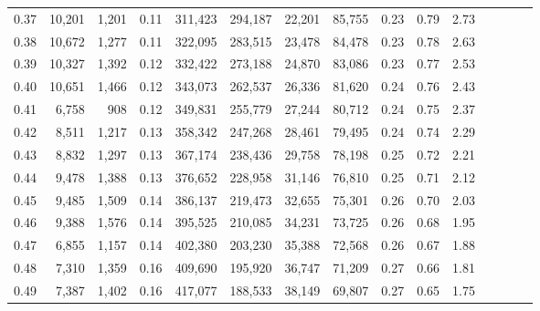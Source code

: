 \begin{tabular}{rrrcrrrrrrrrrrr}
0.37 &  10,201 &  1,201 &                                       0.11 &  311,423 &  294,187 &   22,201 &   85,755 &  0.23 &  0.79 &                         2.73 \\
0.38 &  10,672 &  1,277 &                                       0.11 &  322,095 &  283,515 &   23,478 &   84,478 &  0.23 &  0.78 &                         2.63 \\
0.39 &  10,327 &  1,392 &                                       0.12 &  332,422 &  273,188 &   24,870 &   83,086 &  0.23 &  0.77 &                         2.53 \\
0.40 &  10,651 &  1,466 &                                       0.12 &  343,073 &  262,537 &   26,336 &   81,620 &  0.24 &  0.76 &                         2.43 \\
0.41 &   6,758 &    908 &                                       0.12 &  349,831 &  255,779 &   27,244 &   80,712 &  0.24 &  0.75 &                         2.37 \\
0.42 &   8,511 &  1,217 &                                       0.13 &  358,342 &  247,268 &   28,461 &   79,495 &  0.24 &  0.74 &                         2.29 \\
0.43 &   8,832 &  1,297 &                                       0.13 &  367,174 &  238,436 &   29,758 &   78,198 &  0.25 &  0.72 &                         2.21 \\
0.44 &   9,478 &  1,388 &                                       0.13 &  376,652 &  228,958 &   31,146 &   76,810 &  0.25 &  0.71 &                         2.12 \\
0.45 &   9,485 &  1,509 &                                       0.14 &  386,137 &  219,473 &   32,655 &   75,301 &  0.26 &  0.70 &                         2.03 \\
0.46 &   9,388 &  1,576 &                                       0.14 &  395,525 &  210,085 &   34,231 &   73,725 &  0.26 &  0.68 &                         1.95 \\
0.47 &   6,855 &  1,157 &                                       0.14 &  402,380 &  203,230 &   35,388 &   72,568 &  0.26 &  0.67 &                         1.88 \\
0.48 &   7,310 &  1,359 &                                       0.16 &  409,690 &  195,920 &   36,747 &   71,209 &  0.27 &  0.66 &                         1.81 \\
0.49 &   7,387 &  1,402 &                                       0.16 &  417,077 &  188,533 &   38,149 &   69,807 &  0.27 &  0.65 &                         1.75 \\

\end{tabular}
